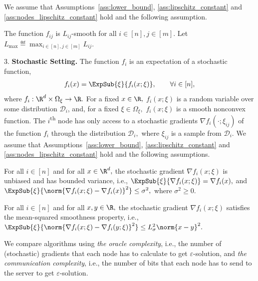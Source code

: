 \documentclass{article}
\begin{document}
We assume that Assumptions~\ref{ass:lower_bound}, \ref{ass:lipschitz_constant} and \ref{ass:nodes_lipschitz_constant} hold and the following assumption.
\begin{assumption}
  \label{ass:max_lipschitz_constant}
  The function $f_{ij}$ is $L_{ij}$-smooth for all $i \in [n], j \in [m].$ Let $L_{\max} \eqdef \max_{i \in [n], j \in [m]} L_{ij}.$
\end{assumption}
3. \textbf{Stochastic Setting.}
The function $f_i$ is an expectation of a stochastic function, 
\begin{align}
    \label{eq:task_staochastic}
    f_i(x) = \ExpSub{\xi}{f_i(x;\xi)}, \qquad \forall i \in [n],
\end{align}
where $f_i :\R^d \times \Omega_{\xi} \rightarrow \R.$ For a fixed $x \in \R,$ $f_i(x;\xi)$ is a random variable over some distribution $\mathcal{D}_i$,
and, for a fixed $\xi \in \Omega_{\xi},$ $f_i(x;\xi)$ is a smooth nonconvex function.
The $i$\textsuperscript{th} node has only access to a stochastic gradients $\nabla f_i(\cdot; \xi_{ij})$ 
of the function $f_i$ through the distribution $\mathcal{D}_i,$ where $\xi_{ij}$ is a sample from $\mathcal{D}_i.$
We assume that Assumptions~\ref{ass:lower_bound}, \ref{ass:lipschitz_constant} and \ref{ass:nodes_lipschitz_constant} hold and the following assumptions.
\begin{assumption}
  \label{ass:stochastic_unbiased_and_variance_bounded}
  For all $i \in [n]$ and for all $x \in \R^d,$ the stochastic gradient $\nabla f_i(x;\xi)$ is unbiased and has bounded variance, i.e., $\ExpSub{\xi}{\nabla f_i(x;\xi)} = \nabla f_i(x),$ and $\ExpSub{\xi}{\norm{\nabla f_i(x;\xi) - \nabla f_i(x)}^2} \leq \sigma^2,$ where $\sigma^2 \geq 0.$
\end{assumption}
\begin{assumption}
  \label{ass:mean_square_smoothness}
  For all $i \in [n]$ and for all $x, y \in \R,$ the stochastic gradient $\nabla f_i(x;\xi)$ satisfies the mean-squared smoothness property, i.e., $\ExpSub{\xi}{\norm{\nabla f_i(x;\xi) - \nabla f_i(y;\xi)}^2} \leq L_{\sigma}^2 \norm{x - y}^2.$
\end{assumption}
We compare algorithms using \textit{the oracle complexity}, i.e., the number of (stochastic) gradients that each node has to calculate to get $\varepsilon$-solution, and \textit{the communication complexity}, i.e., the number of bits that each node has to send to the server to get $\varepsilon$-solution.
\end{document}
